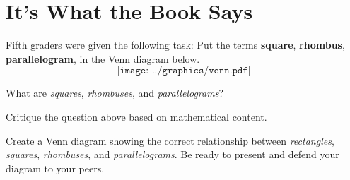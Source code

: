\newpage
\section{It's What the Book Says} 

Fifth graders were given the following task: Put the
terms \textbf{square}, \textbf{rhombus}, \textbf{parallelogram}, in
the Venn diagram below.
\[
\texttt{[image: ../graphics/venn.pdf]}
\]


\begin{prob} 
What are \textit{squares}, \textit{rhombuses},
and \textit{parallelograms}?
\end{prob}


\begin{prob} 
Critique the question above based on mathematical content.
\end{prob}

\begin{prob} 
Create a Venn diagram showing the correct relationship
between \textit{rectangles}, \textit{squares}, \textit{rhombuses},
and \textit{parallelograms}. Be ready to present and defend your
diagram to your peers.
\end{prob}
